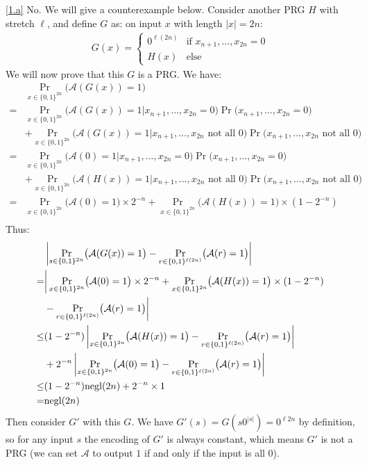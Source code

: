 \documentclass{homework}
\begin{document}
\begin{solution}
\ref{1.a} No. We will give a counterexample below. Consider another PRG $H$ with stretch $\ell$, and define $G$ as: on input $x$ with length $|x|=2n$:
\begin{align*}
  G(x) = \begin{cases}
    0^{\ell(2n)} & \text{if } x_{n+1},...,x_{2n}=0 \\
    H(x) & \text{else}
  \end{cases}
\end{align*}
We will now prove that this $G$ is a PRG. We have:
\begin{align*}
  &\Pr_{x\in\{0,1\}^{2n}}\bigl(\mathcal{A}(G(x))=1\bigr) \\
  =& \Pr_{x\in\{0,1\}^{2n}}\bigl(\mathcal{A}(G(x))=1\big|x_{n+1},...,x_{2n}=0\bigr)\Pr\bigl(x_{n+1},...,x_{2n}=0\bigr)\\
  &+ \Pr_{x\in\{0,1\}^{2n}}\bigl(\mathcal{A}(G(x))=1\big|x_{n+1},...,x_{2n}\text{ not all }0\bigr)\Pr\bigl(x_{n+1},...,x_{2n}\text{ not all }0\bigr)\\
  =& \Pr_{x\in\{0,1\}^{2n}}\bigl(\mathcal{A}(0)=1\big|x_{n+1},...,x_{2n}=0\bigr)\Pr\bigl(x_{n+1},...,x_{2n}=0\bigr)\\
  &+ \Pr_{x\in\{0,1\}^{2n}}\bigl(\mathcal{A}(H(x))=1\big|x_{n+1},...,x_{2n}\text{ not all }0\bigr)\Pr\bigl(x_{n+1},...,x_{2n}\text{ not all }0\bigr)\\
  =& \Pr_{x\in\{0,1\}^{2n}}\bigl(\mathcal{A}(0)=1\bigr)\times 2^{-n} + \Pr_{x\in\{0,1\}^{2n}}\bigl(\mathcal{A}(H(x))=1\bigr)\times (1-2^{-n})\\
\end{align*}
Thus:
\begin{align*}
  &\left\lvert \Pr_{s\in\{0,1\}^{2n}}\bigl(\mathcal{A}(G(x))=1\bigr) - \Pr_{r\in\{0,1\}^{\ell(2n)}}\bigl(\mathcal{A}(r)=1\bigr) \right\rvert\\
  =&\bigg|\Pr_{x\in\{0,1\}^{2n}}\bigl(\mathcal{A}(0)=1\bigr)\times 2^{-n} + \Pr_{x\in\{0,1\}^{2n}}\bigl(\mathcal{A}(H(x))=1\bigr)\times (1-2^{-n}) \\
  &- \Pr_{r\in\{0,1\}^{\ell(2n)}}\bigl(\mathcal{A}(r)=1\bigr)\bigg|\\
  \le &(1-2^{-n})\left\lvert \Pr_{x\in\{0,1\}^{2n}}\bigl(\mathcal{A}(H(x))=1\bigr) - \Pr_{r\in\{0,1\}^{\ell(2n)}}\bigl(\mathcal{A}(r)=1\bigr) \right\rvert\\
  &+ 2^{-n}\left\lvert \Pr_{x\in\{0,1\}^{2n}}\bigl(\mathcal{A}(0)=1\bigr)-\Pr_{r\in\{0,1\}^{\ell(2n)}}\bigl(\mathcal{A}(r)=1\bigr) \right\rvert\\
  \le& (1-2^{-n})\text{negl}(2n) + 2^{-n}\times 1\\
  =& \text{negl}(2n)
\end{align*}
Then consider $G'$ with this $G$. We have $G'(s) = G(s0^{|s|}) = 0^{\ell{2n}}$ by definition, so for any input $s$ the encoding of $G'$ is always constant, which means $G'$ is not a PRG (we can set $\mathcal{A}$ to output $1$ if and only if the input is all $0$).


\end{solution}
\end{document}
